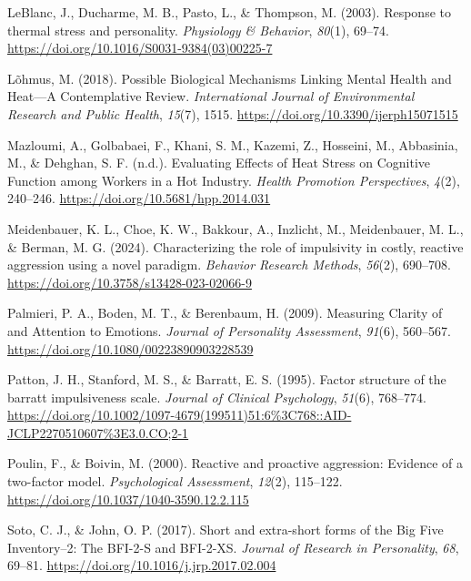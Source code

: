 \documentclass[
  man,
  floatsintext,
  longtable,
  nolmodern,
  notxfonts,
  notimes,
  colorlinks=true,linkcolor=blue,citecolor=blue,urlcolor=blue]{apa7}
\newlength{\cslhangindent}
\newenvironment{CSLReferences}[2] %
 {\begin{list}{}{%
  \setlength{\itemindent}{0pt}
  \setlength{\leftmargin}{0pt}
  \setlength{\parsep}{0pt}
  \ifodd #1
   \setlength{\leftmargin}{\cslhangindent}
   \setlength{\itemindent}{-1\cslhangindent}
  \fi
  \setlength{\itemsep}{#2\baselineskip}}}
 {\end{list}}
\begin{document}
\begin{CSLReferences}{1}{0}
LeBlanc, J., Ducharme, M. B., Pasto, L., \& Thompson, M. (2003).
Response to thermal stress and personality. \emph{Physiology \&
Behavior}, \emph{80}(1), 69--74.
\url{https://doi.org/10.1016/S0031-9384(03)00225-7}

Lõhmus, M. (2018). Possible {Biological Mechanisms Linking Mental
Health} and {Heat}---{A Contemplative Review}. \emph{International
Journal of Environmental Research and Public Health}, \emph{15}(7),
1515. \url{https://doi.org/10.3390/ijerph15071515}

Mazloumi, A., Golbabaei, F., Khani, S. M., Kazemi, Z., Hosseini, M.,
Abbasinia, M., \& Dehghan, S. F. (n.d.). Evaluating {Effects} of {Heat
Stress} on {Cognitive Function} among {Workers} in a {Hot Industry}.
\emph{Health Promotion Perspectives}, \emph{4}(2), 240--246.
\url{https://doi.org/10.5681/hpp.2014.031}

Meidenbauer, K. L., Choe, K. W., Bakkour, A., Inzlicht, M., Meidenbauer,
M. L., \& Berman, M. G. (2024). Characterizing the role of impulsivity
in costly, reactive aggression using a novel paradigm. \emph{Behavior
Research Methods}, \emph{56}(2), 690--708.
\url{https://doi.org/10.3758/s13428-023-02066-9}

Palmieri, P. A., Boden, M. T., \& Berenbaum, H. (2009). Measuring
{Clarity} of and {Attention} to {Emotions}. \emph{Journal of Personality
Assessment}, \emph{91}(6), 560--567.
\url{https://doi.org/10.1080/00223890903228539}

Patton, J. H., Stanford, M. S., \& Barratt, E. S. (1995). Factor
structure of the barratt impulsiveness scale. \emph{Journal of Clinical
Psychology}, \emph{51}(6), 768--774.
\url{https://doi.org/10.1002/1097-4679(199511)51:6\%3C768::AID-JCLP2270510607\%3E3.0.CO;2-1}

Poulin, F., \& Boivin, M. (2000). Reactive and proactive aggression:
{Evidence} of a two-factor model. \emph{Psychological Assessment},
\emph{12}(2), 115--122. \url{https://doi.org/10.1037/1040-3590.12.2.115}

Soto, C. J., \& John, O. P. (2017). Short and extra-short forms of the
{Big Five Inventory}--2: {The BFI-2-S} and {BFI-2-XS}. \emph{Journal of
Research in Personality}, \emph{68}, 69--81.
\url{https://doi.org/10.1016/j.jrp.2017.02.004}


\end{CSLReferences}
\end{document}
